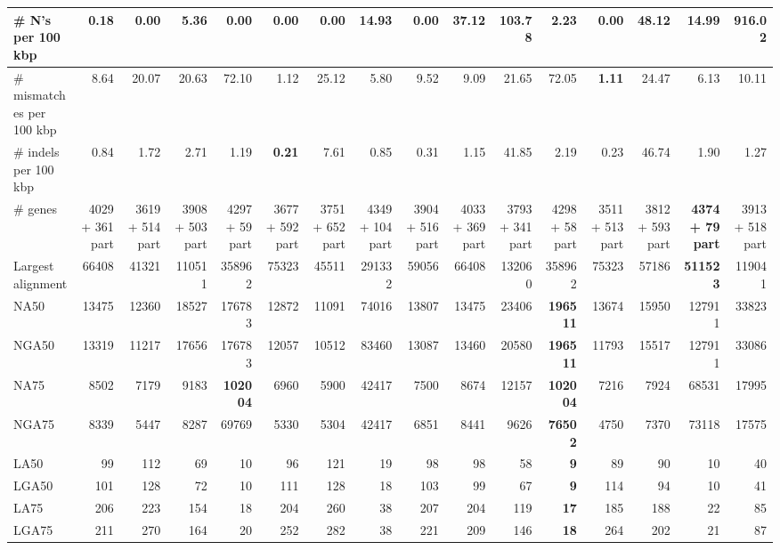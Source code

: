\documentclass[12pt,a4paper]{article}
\begin{document}
\begin{table}[ht]
\begin{center}
\begin{tabular}{|l*{15}{|r}|}
\# N's per 100 kbp & 0.18 & {\bf 0.00} & 5.36 & {\bf 0.00} & {\bf 0.00} & {\bf 0.00} & 14.93 & {\bf 0.00} & 37.12 & 103.78 & 2.23 & {\bf 0.00} & 48.12 & 14.99 & 916.02 \\ \hline
\# mismatches per 100 kbp & 8.64 & 20.07 & 20.63 & 72.10 & 1.12 & 25.12 & 5.80 & 9.52 & 9.09 & 21.65 & 72.05 & {\bf 1.11} & 24.47 & 6.13 & 10.11 \\ \hline
\# indels per 100 kbp & 0.84 & 1.72 & 2.71 & 1.19 & {\bf 0.21} & 7.61 & 0.85 & 0.31 & 1.15 & 41.85 & 2.19 & 0.23 & 46.74 & 1.90 & 1.27 \\ \hline
\# genes & 4029 + 361 part & 3619 + 514 part & 3908 + 503 part & 4297 + 59 part & 3677 + 592 part & 3751 + 652 part & 4349 + 104 part & 3904 + 516 part & 4033 + 369 part & 3793 + 341 part & 4298 + 58 part & 3511 + 513 part & 3812 + 593 part & {\bf 4374 + 79 part} & 3913 + 518 part \\ \hline
Largest alignment & 66408 & 41321 & 110511 & 358962 & 75323 & 45511 & 291332 & 59056 & 66408 & 132060 & 358962 & 75323 & 57186 & {\bf 511523} & 119041 \\ \hline
NA50 & 13475 & 12360 & 18527 & 176783 & 12872 & 11091 & 74016 & 13807 & 13475 & 23406 & {\bf 196511} & 13674 & 15950 & 127911 & 33823 \\ \hline
NGA50 & 13319 & 11217 & 17656 & 176783 & 12057 & 10512 & 83460 & 13087 & 13460 & 20580 & {\bf 196511} & 11793 & 15517 & 127911 & 33086 \\ \hline
NA75 & 8502 & 7179 & 9183 & {\bf 102004} & 6960 & 5900 & 42417 & 7500 & 8674 & 12157 & {\bf 102004} & 7216 & 7924 & 68531 & 17995 \\ \hline
NGA75 & 8339 & 5447 & 8287 & 69769 & 5330 & 5304 & 42417 & 6851 & 8441 & 9626 & {\bf 76502} & 4750 & 7370 & 73118 & 17575 \\ \hline
LA50 & 99 & 112 & 69 & 10 & 96 & 121 & 19 & 98 & 98 & 58 & {\bf 9} & 89 & 90 & 10 & 40 \\ \hline
LGA50 & 101 & 128 & 72 & 10 & 111 & 128 & 18 & 103 & 99 & 67 & {\bf 9} & 114 & 94 & 10 & 41 \\ \hline
LA75 & 206 & 223 & 154 & 18 & 204 & 260 & 38 & 207 & 204 & 119 & {\bf 17} & 185 & 188 & 22 & 85 \\ \hline
LGA75 & 211 & 270 & 164 & 20 & 252 & 282 & 38 & 221 & 209 & 146 & {\bf 18} & 264 & 202 & 21 & 87 \\ \hline
\end{tabular}
\end{center}
\end{table}
\end{document}
